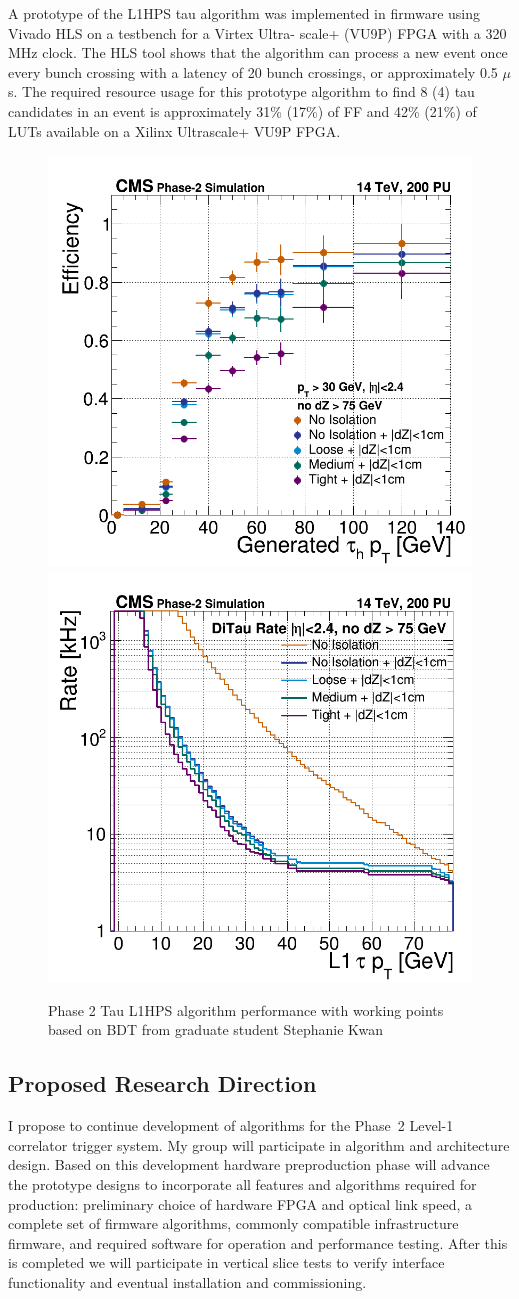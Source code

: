 \documentclass[preprint,12pt]{elsarticle}
\begin{document}
A prototype of the L1HPS tau algorithm was implemented in firmware using 
Vivado HLS on a testbench for a Virtex Ultra- scale+ (VU9P) FPGA with a 320 MHz clock. The HLS 
tool shows that the algorithm can process a new event once every bunch crossing with a latency 
of 20 bunch crossings, or approximately 0.5 $\mu$s. The required resource usage for this prototype 
algorithm to find 8 (4) tau candidates in an event is approximately 31\% (17\%) of FF and 42\% 
(21\%) of LUTs available on a Xilinx Ultrascale+ VU9P FPGA. 

\begin{figure}[h]
\centering\includegraphics[width=0.45\linewidth]{genPt_1_DZ_2p4.png}
\centering\includegraphics[width=0.45\linewidth]{l1DiTau_pt_eta2p4-thresh75.png}
\caption{Phase 2 Tau L1HPS algorithm performance with working points based on BDT from graduate student Stephanie Kwan}
\label{fig:Phase_2_L1_Tau}
\end{figure}

\subsection{Proposed Research Direction}
I propose to continue development of algorithms for the Phase~2 Level-1 correlator trigger system.
My group will participate in algorithm and architecture design. Based on this development 
hardware preproduction phase will advance the
prototype designs to incorporate all features and algorithms required for
production: preliminary choice of hardware FPGA and optical link speed,
a complete set of firmware algorithms, commonly compatible infrastructure
firmware, and required software for operation and performance testing.
After this is completed we will participate in vertical slice tests to
verify interface functionality and eventual installation and commissioning.
\end{document}

